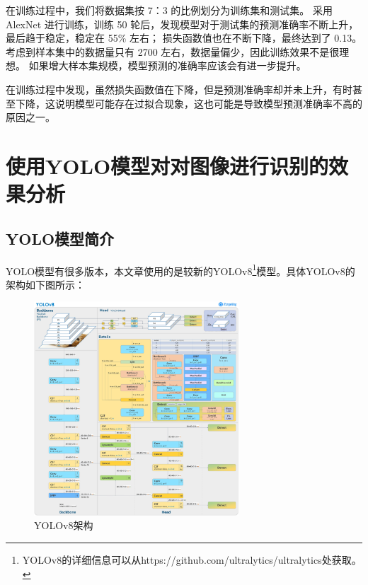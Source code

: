 \documentclass[UTF8]{ctexart}
\begin{document}
在训练过程中，我们将数据集按 7：3 的比例划分为训练集和测试集。
采用 AlexNet 进行训练，训练 50 轮后，发现模型对于测试集的预测准确率不断上升，最后趋于稳定，稳定在 55\% 左右；
损失函数值也在不断下降，最终达到了 0.13。考虑到样本集中的数据量只有 2700 左右，数据量偏少，因此训练效果不是很理想。
如果增大样本集规模，模型预测的准确率应该会有进一步提升。 \par
在训练过程中发现，虽然损失函数值在下降，但是预测准确率却并未上升，有时甚至下降，这说明模型可能存在过拟合现象，这也可能是导致模型预测准确率不高的原因之一。

\section{使用YOLO模型对对图像进行识别的效果分析}

\subsection{YOLO模型简介}
YOLO模型有很多版本，本文章使用的是较新的YOLOv8\footnote{YOLOv8的详细信息可以从https://github.com/ultralytics/ultralytics处获取。}模型。具体YOLOv8的架构如下图所示：

\begin{figure}[H]
    \centering %
    \includegraphics[height=8cm]{../YOLO/pics/img1.png}
    \caption{YOLOv8架构}
\end{figure}

\end{document}
